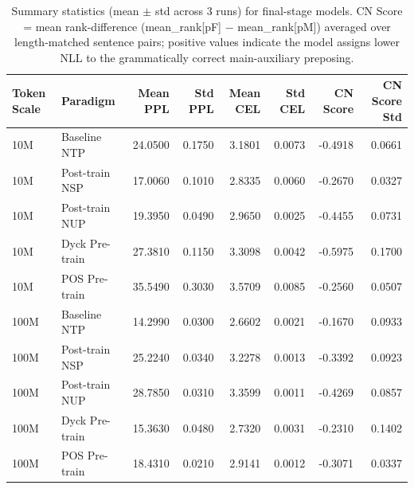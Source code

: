 \begin{table}[ht]
\centering
\caption{Summary statistics (mean $\pm$ std across 3 runs) for final-stage models. CN Score = mean rank-difference (mean\_rank[pF] $-$ mean\_rank[pM]) averaged over length-matched sentence pairs; positive values indicate the model assigns lower NLL to the grammatically correct main-auxiliary preposing.}
\label{{tab:summary}}
\begin{tabular}{llrrrrrr}
\toprule
Token Scale & Paradigm & Mean PPL & Std PPL & Mean CEL & Std CEL & CN Score & CN Score Std \\
\midrule
10M & Baseline NTP & 24.0500 & 0.1750 & 3.1801 & 0.0073 & -0.4918 & 0.0661 \\
10M & Post-train NSP & 17.0060 & 0.1010 & 2.8335 & 0.0060 & -0.2670 & 0.0327 \\
10M & Post-train NUP & 19.3950 & 0.0490 & 2.9650 & 0.0025 & -0.4455 & 0.0731 \\
10M & Dyck Pre-train & 27.3810 & 0.1150 & 3.3098 & 0.0042 & -0.5975 & 0.1700 \\
10M & POS Pre-train & 35.5490 & 0.3030 & 3.5709 & 0.0085 & -0.2560 & 0.0507 \\
100M & Baseline NTP & 14.2990 & 0.0300 & 2.6602 & 0.0021 & -0.1670 & 0.0933 \\
100M & Post-train NSP & 25.2240 & 0.0340 & 3.2278 & 0.0013 & -0.3392 & 0.0923 \\
100M & Post-train NUP & 28.7850 & 0.0310 & 3.3599 & 0.0011 & -0.4269 & 0.0857 \\
100M & Dyck Pre-train & 15.3630 & 0.0480 & 2.7320 & 0.0031 & -0.2310 & 0.1402 \\
100M & POS Pre-train & 18.4310 & 0.0210 & 2.9141 & 0.0012 & -0.3071 & 0.0337 \\
\bottomrule
\end{tabular}
\end{table}